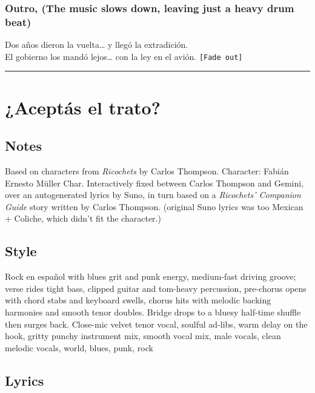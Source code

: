 \subsubsection{Outro, (The music slows down, leaving just a heavy drum
beat)}\label{outro-the-music-slows-down-leaving-just-a-heavy-drum-beat}

Dos años dieron la vuelta\ldots{} y llegó la extradición.\\
El gobierno los mandó lejos\ldots{} con la ley en el avión.
\texttt{{[}Fade\ out{]}}

\begin{center}\rule{0.5\linewidth}{0.5pt}\end{center}

\section{¿Aceptás el trato?}\label{aceptuxe1s-el-trato}

\subsection{Notes}\label{notes-24}

Based on characters from \emph{Ricochets} by Carlos Thompson. Character:
Fabián Ernesto Müller Char. Interactively fixed between Carlos Thompson
and Gemini, over an autogenerated lyrics by Suno, in turn based on a
\emph{Ricochets' Companion Guide} story written by Carlos Thompson.
(original Suno lyrics was too Mexican + Coliche, which didn't fit the
character.)

\subsection{Style}\label{style-23}

Rock en español with blues grit and punk energy, medium-fast driving
groove; verse rides tight bass, clipped guitar and tom-heavy percussion,
pre-chorus opens with chord stabs and keyboard swells, chorus hits with
melodic backing harmonies and smooth tenor doubles. Bridge drops to a
bluesy half-time shuffle then surges back. Close-mic velvet tenor vocal,
soulful ad-libs, warm delay on the hook, gritty punchy instrument mix,
smooth vocal mix, male vocals, clean melodic vocals, world, blues, punk,
rock

\subsection{Lyrics}\label{lyrics-23}

